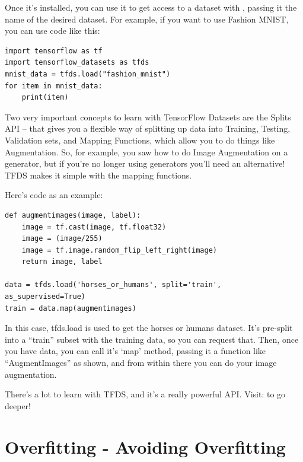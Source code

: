 

Once it's installed, you can use it to get access to a dataset with , passing it the name of the desired dataset. For example, if you want to use Fashion MNIST, you can use code like this:

\begin{lstlisting}
import tensorflow as tf
import tensorflow_datasets as tfds
mnist_data = tfds.load("fashion_mnist")
for item in mnist_data:
    print(item)
\end{lstlisting}

Two very important concepts to learn with TensorFlow Datasets are the Splits API -- that gives you a flexible way of splitting up data into Training, Testing, Validation sets, and Mapping Functions, which allow you to do things like Augmentation. So, for example, you saw how to do Image Augmentation on a generator, but if you’re no longer using generators you’ll need an alternative! TFDS makes it simple with the mapping functions.

Here's code as an example:

\begin{lstlisting}
def augmentimages(image, label):
    image = tf.cast(image, tf.float32)
    image = (image/255)
    image = tf.image.random_flip_left_right(image)
    return image, label

data = tfds.load('horses_or_humans', split='train', as_supervised=True)
train = data.map(augmentimages)
\end{lstlisting}

In this case, tfds.load is used to get the horses or humans dataset. It's pre-split into a ``train'' subset with the training data, so you can request that. Then, once you have data, you can call it’s ‘map’ method, passing it a function like ``AugmentImages'' as shown, and from within there you can do your image augmentation.

There's a lot to learn with TFDS, and it’s a really powerful API. Visit:  to go deeper!

\section{Overfitting - Avoiding Overfitting}

